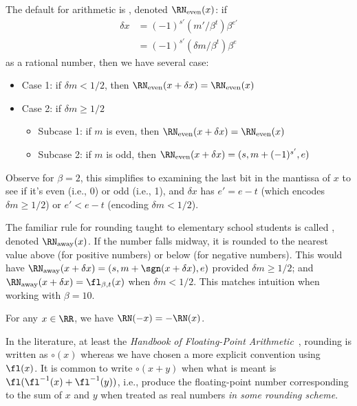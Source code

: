 \begin{defn}
  The default for  arithmetic is
  ,
  denoted $\RN_{\text{even}}(x)$:
  if
  \begin{equation}
    \begin{split}
      \delta x &= (-1)^{s'}(m'/\beta^{t})\beta^{e'}\\
      &= (-1)^{s'}(\delta m/\beta^{t})\beta^{e}
    \end{split}
  \end{equation}
  as a rational number, then we have several case:
  \begin{itemize}
    \item Case 1: if $\delta m<1/2$, then $\RN_{\text{even}}(x+\delta x)=\RN_{\text{even}}(x)$
    \item Case 2: if $\delta m\geq1/2$
      \begin{itemize}
        \item Subcase 1: if $m$ is even, then $\RN_{\text{even}}(x+\delta x)=\RN_{\text{even}}(x)$
        \item Subcase 2: if $m$ is odd, then $\RN_{\text{even}}(x+\delta x)=(s,m+(-1)^{s'},e)$
      \end{itemize}
  \end{itemize}
  Observe for $\beta=2$, this simplifies to examining the last bit in
  the mantissa of $x$ to see if it's even (i.e., 0) or odd (i.e., 1),
  and $\delta x$ has $e'=e-t$ (which encodes $\delta m\geq1/2$) or
  $e'<e-t$ (encoding $\delta m<1/2$).
\end{defn}
\begin{defn}
  The familiar rule for rounding taught to elementary school students is
  called , denoted $\RN_{\text{away}}(x)$. If the number falls
  midway, it is rounded to the nearest value above (for positive
  numbers) or below (for negative numbers). This would have
  $\RN_{\text{away}}(x+\delta x)=(s,m+\sgn(x+\delta x), e)$ provided $\delta m\geq1/2$;
  and $\RN_{\text{away}}(x+\delta x)=\fl_{\beta,t}(x)$ when $\delta m<1/2$.
  This matches intuition when working with $\beta=10$.
\end{defn}

\begin{thm}
  For any $x\in\RR$, we have $\RN(-x)=-\RN(x)$.
\end{thm}

\begin{notation}
In the literature, at least the \emph{Handbook of Floating-Point Arithmetic}~\cite{10.5555/3235984},
rounding is written as $\circ(x)$ whereas we have chosen a more explicit
convention using $\fl(x)$. It is common to write $\circ(x+y)$ when what
is meant is $\fl(\fl^{-1}(x)+\fl^{-1}(y))$, i.e., produce the
floating-point number corresponding to the sum of $x$ and $y$ when
treated as real numbers \emph{in some rounding scheme}.
\end{notation}

